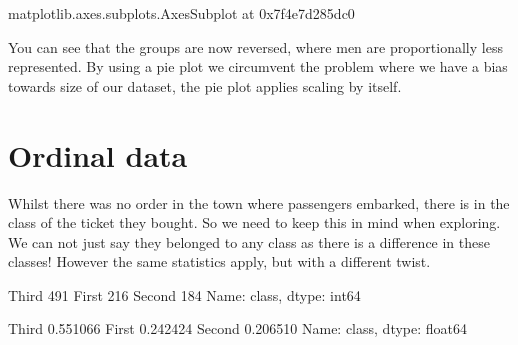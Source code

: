 \documentclass[letterpaper,10pt,english]{jupyterBook}
\begin{document}
\begin{sphinxVerbatim}[commandchars=\\\{\}]
\PYGZlt{}matplotlib.axes.\PYGZus{}subplots.AxesSubplot at 0x7f4e7d285dc0\PYGZgt{}
\end{sphinxVerbatim}

\noindent{}

\sphinxAtStartPar
You can see that the groups are now reversed, where men are proportionally less represented.
By using a pie plot we circumvent the problem where we have a bias towards size of our dataset, the pie plot applies scaling by itself.


\section{Ordinal data}
\label{\detokenize{c5_data_exploration/univariate_analysis:ordinal-data}}
\sphinxAtStartPar
Whilst there was no order in the town where passengers embarked, there is in the class of the ticket they bought. So we need to keep this in mind when exploring. We can not just say they belonged to any class as there is a difference in these classes! However the same statistics apply, but with a different twist.

\begin{sphinxVerbatim}[commandchars=\\\{\}]
\PYG{p}{[}\PYG{p}{]}
\end{sphinxVerbatim}

\begin{sphinxVerbatim}[commandchars=\\\{\}]
Third     491
First     216
Second    184
Name: class, dtype: int64
\end{sphinxVerbatim}

\begin{sphinxVerbatim}[commandchars=\\\{\}]
\PYG{p}{[}\PYG{p}{]}
\end{sphinxVerbatim}

\begin{sphinxVerbatim}[commandchars=\\\{\}]
Third     0.551066
First     0.242424
Second    0.206510
Name: class, dtype: float64
\end{sphinxVerbatim}
\end{document}
